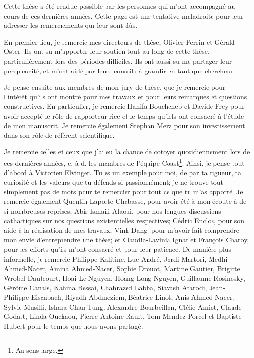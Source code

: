 \documentclass[12pt]{thesul}
\theoremstyle{definition}
\newcommand{\ie}{c.-à-d.\xspace}
\begin{document}
\begin{ThesisAcknowledgments}
Cette thèse a été rendue possible par les personnes qui m'ont accompagné au cours de ces dernières années.
Cette page est une tentative maladroite pour leur adresser les remerciements qui leur sont dûs.


En premier lieu, je remercie mes directeurs de thèse, Olivier Perrin et Gérald Oster.
Ils ont su m'apporter leur soutien tout au long de cette thèse, particulièrement lors des périodes difficiles.
Ils ont aussi su me partager leur perspicacité, et m'ont aidé par leurs conseils à grandir en tant que chercheur.


Je pense ensuite aux membres de mon jury de thèse, que je remercie pour l'intérêt qu'ils ont montré pour mes travaux et pour leurs remarques et questions constructives.
En particulier, je remercie Hanifa Boucheneb et Davide Frey pour avoir accepté le rôle de rapporteur-rice et le temps qu'iels ont consacré à l'étude de mon manuscrit.
Je remercie également Stephan Merz pour son investissement dans son rôle de référent scientifique.


Je remercie celles et ceux que j'ai eu la chance de cotoyer quotidiennement lors de ces dernières années, \ie les membres de l'équipe Coast\footnote{Au sens large.}.
Ainsi, je pense tout d'abord à Victorien Elvinger.
Tu es un exemple pour moi, de par ta rigueur, ta curiosité et les valeurs que tu défends si passionnément; je ne trouve tout simplement pas de mots pour te remercier pour tout ce que tu m'as apporté.
Je remercie également Quentin Laporte-Chabasse, pour avoir été à mon écoute à de si nombreuses reprises; Abir Ismaili-Alaoui, pour nos longues discussions cathartiques sur nos questions existentielles respectives; Cédric Enclos, pour son aide à la réalisation de mes travaux; Vinh Dang, pour m'avoir fait comprendre mon envie d'entreprendre une thèse; et Claudia-Lavinia Ignat et François Charoy, pour les efforts qu'ils m'ont consacré et pour leur patience.
De manière plus informelle, je remercie Philippe Kalitine, Luc André, Jordi Martori, Medhi Ahmed-Nacer, Amina Ahmed-Nacer, Sophie Drouot, Martine Gautier, Brigitte Wrobel-Dautcourt, Hoai Le Nguyen, Hoang Long Nguyen, Guillaume Rosinosky, Gérôme Canals, Kahina Bessai, Chahrazed Labba, Siavash Atarodi, Jean-Philippe Eisenbach, Riyadh Abdmeziem, Béatrice Linot, Anis Ahmed-Nacer, Sylvie Musilli, Ishara Chan-Tung, Alexandre Bourbeillon, Clélie Amiot, Claude Godart, Linda Ouchaou, Pierre Antoine Rault, Tom Mendez-Porcel et Baptiste Hubert pour le temps que nous avons partagé.



\end{ThesisAcknowledgments}
\end{document}
